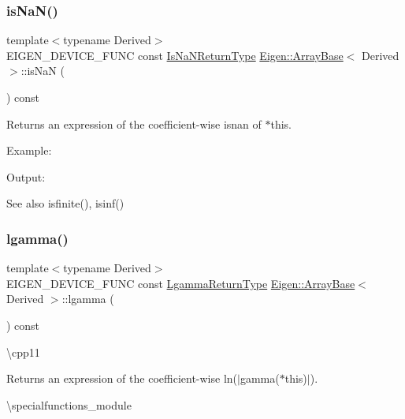 \subsubsection{\texorpdfstring{isNaN()}{isNaN()}}
{\footnotesize\ttfamily template$<$typename Derived$>$ \\
E\+I\+G\+E\+N\+\_\+\+D\+E\+V\+I\+C\+E\+\_\+\+F\+U\+NC const \mbox{\hyperlink{class_eigen_1_1_cwise_unary_op}{Is\+Na\+N\+Return\+Type}} \mbox{\hyperlink{class_eigen_1_1_array_base}{Eigen\+::\+Array\+Base}}$<$ Derived $>$\+::is\+NaN (\begin{DoxyParamCaption}{ }\end{DoxyParamCaption}) const\hspace{0.3cm}{\ttfamily [inline]}}

\begin{DoxyReturn}{Returns}
an expression of the coefficient-\/wise isnan of $\ast$this.
\end{DoxyReturn}
Example\+: 
\begin{DoxyCodeInclude}{0}
\end{DoxyCodeInclude}
 Output\+: 
\begin{DoxyVerbInclude}
\end{DoxyVerbInclude}


\begin{DoxySeeAlso}{See also}
isfinite(), isinf() 
\end{DoxySeeAlso}
\mbox{\label{class_eigen_1_1_array_base_aaacc294090a265da0dc695737750dd28}} 
\subsubsection{\texorpdfstring{lgamma()}{lgamma()}}
{\footnotesize\ttfamily template$<$typename Derived$>$ \\
E\+I\+G\+E\+N\+\_\+\+D\+E\+V\+I\+C\+E\+\_\+\+F\+U\+NC const \mbox{\hyperlink{class_eigen_1_1_cwise_unary_op}{Lgamma\+Return\+Type}} \mbox{\hyperlink{class_eigen_1_1_array_base}{Eigen\+::\+Array\+Base}}$<$ Derived $>$\+::lgamma (\begin{DoxyParamCaption}{ }\end{DoxyParamCaption}) const\hspace{0.3cm}{\ttfamily [inline]}}

\textbackslash{}cpp11 \begin{DoxyReturn}{Returns}
an expression of the coefficient-\/wise ln($\vert$gamma($\ast$this)$\vert$).
\end{DoxyReturn}
\textbackslash{}specialfunctions\+\_\+module

